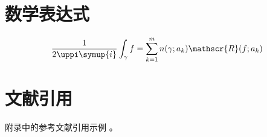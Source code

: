\section{数学表达式}

\begin{equation}
    \frac{1}{2 \uppi \symup{i}} \int_\gamma f = \sum_{k=1}^m n(\gamma; a_k) \mathscr{R}(f; a_k)
    \label{eq:appendix-equation}
\end{equation}


\section{文献引用}

附录\cite{dupont1974bone}中的参考文献引用\cite{zhengkaiqing1987}示例
\cite{dupont1974bone,zhengkaiqing1987}。

